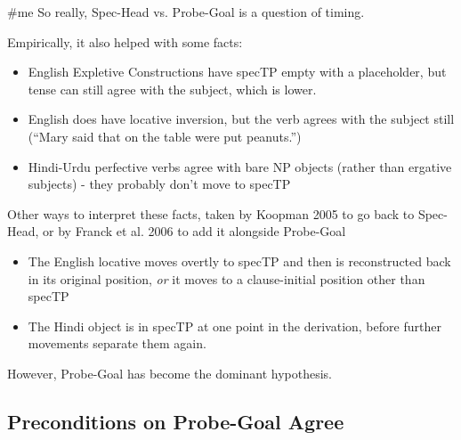 \#me So really, Spec-Head vs. Probe-Goal is a question of timing.

Empirically, it also helped with some facts:

\begin{itemize}
  \item English Expletive Constructions have specTP empty with a placeholder, but tense can still agree with the subject, which is lower.
  \item English does have locative inversion, but the verb agrees with the subject still (``Mary said that on the table were put peanuts.'')
  \item Hindi-Urdu perfective verbs agree with bare NP objects (rather than ergative subjects) - they probably don't move to specTP
\end{itemize}

Other ways to interpret these facts, taken by Koopman 2005 to go back to Spec-Head, or by Franck et al. 2006 to add it alongside Probe-Goal

\begin{itemize}
  \item The English locative moves overtly to specTP and then is reconstructed back in its original position, \textit{or} it moves to a clause-initial position other than specTP
  \item The Hindi object is in specTP at one point in the derivation, before further movements separate them again.
\end{itemize}

However, Probe-Goal has become the dominant hypothesis.

\subsection*{Preconditions on Probe-Goal Agree}

